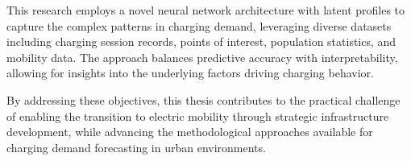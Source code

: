 This research employs a novel neural network architecture with latent profiles to capture the complex patterns in charging demand, leveraging diverse datasets including charging session records, points of interest, population statistics, and mobility data. The approach balances predictive accuracy with interpretability, allowing for insights into the underlying factors driving charging behavior.

By addressing these objectives, this thesis contributes to the practical challenge of enabling the transition to electric mobility through strategic infrastructure development, while advancing the methodological approaches available for charging demand forecasting in urban environments.
